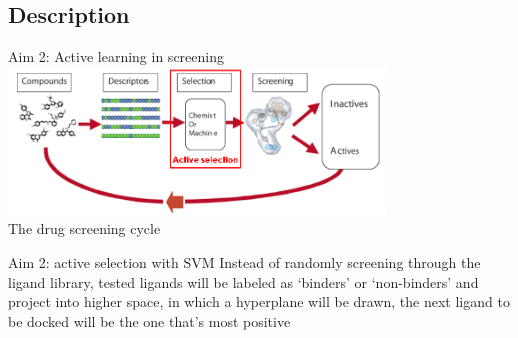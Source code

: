\subsection{Description}
\begin{frame}{Aim 2: Active learning in screening}
\centering  
\includegraphics[width = 0.75\textwidth]{../figures/active.png}\\
 {\scriptsize The drug screening cycle \footnotemark[1]}

\begin{block}{Aim 2: active selection with SVM}
Instead of randomly screening through the ligand library, tested ligands will be labeled as `binders' or `non-binders' and project into higher space, in which a hyperplane will be drawn, the next ligand to be docked will be the one that's most positive
\end{block}
\end{frame}

